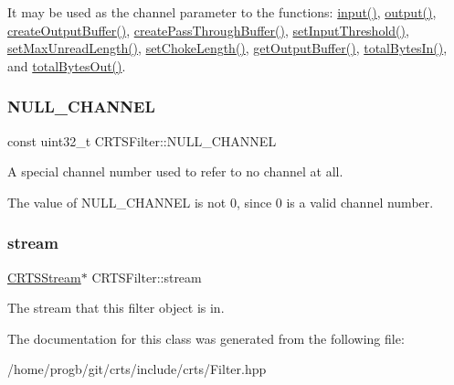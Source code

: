 It may be used as the channel parameter to the functions\+: \hyperlink{classCRTSFilter_ab75eb3db5914c0d6b3781439d46b2301}{input()}, \hyperlink{classCRTSFilter_afe899250f3aa73aa8eb5aed7dfc371de}{output()}, \hyperlink{classCRTSFilter_a7a10a3daf1d7ee26e8b414c16901b315}{create\+Output\+Buffer()}, \hyperlink{classCRTSFilter_a462892f9ed127c6280f2e62f97aca5bc}{create\+Pass\+Through\+Buffer()}, \hyperlink{classCRTSFilter_a4d221e7b871d483f68c73c379fd08cd3}{set\+Input\+Threshold()}, \hyperlink{classCRTSFilter_aa484e49c5a75c467209324930bc1a0bf}{set\+Max\+Unread\+Length()}, \hyperlink{classCRTSFilter_acadfaf372947b1b7cbcb5667e6b74026}{set\+Choke\+Length()}, \hyperlink{classCRTSFilter_a16b908a9f9ec81ff3b52a98f447b3bb4}{get\+Output\+Buffer()}, \hyperlink{classCRTSFilter_a2790e3d559443f54724a060b5abec4b7}{total\+Bytes\+In()}, and \hyperlink{classCRTSFilter_a4e67f7953354ba62d0b28fec0819abb7}{total\+Bytes\+Out()}. \mbox{\label{classCRTSFilter_af731176aa73539af3cfc69b6c1051f82}} 
\subsubsection{\texorpdfstring{N\+U\+L\+L\+\_\+\+C\+H\+A\+N\+N\+EL}{NULL\_CHANNEL}}
{\footnotesize\ttfamily const uint32\+\_\+t C\+R\+T\+S\+Filter\+::\+N\+U\+L\+L\+\_\+\+C\+H\+A\+N\+N\+EL\hspace{0.3cm}{\ttfamily [static]}}

A special channel number used to refer to no channel at all.

The value of {\ttfamily N\+U\+L\+L\+\_\+\+C\+H\+A\+N\+N\+EL} is not 0, since 0 is a valid channel number. \mbox{\label{classCRTSFilter_aa6986d6a10ed56ea4af4ebcf41337e73}} 
\subsubsection{\texorpdfstring{stream}{stream}}
{\footnotesize\ttfamily \hyperlink{classCRTSStream}{C\+R\+T\+S\+Stream}$\ast$ C\+R\+T\+S\+Filter\+::stream}

The stream that this filter object is in. 

The documentation for this class was generated from the following file\+:\begin{DoxyCompactItemize}
\item 
/home/progb/git/crts/include/crts/Filter.\+hpp\end{DoxyCompactItemize}
